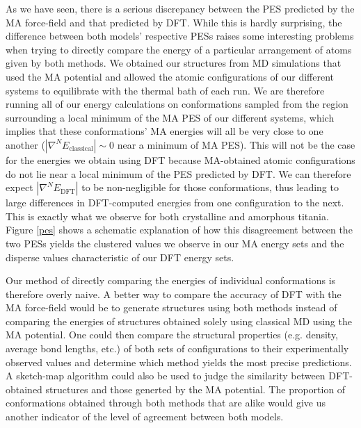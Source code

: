 \documentclass[aps,prb,twocolumn,amsmath,amssymb,superscriptaddress,longbibliography]{revtex4-1}
\newcommand\tab[1][1cm]{\hspace*{#1}} %
\begin{document}
\tab As we have seen, there is a serious discrepancy between the PES predicted by the MA force-field and that predicted by DFT.
While this is hardly surprising, the difference between both models' respective PESs raises some interesting problems when trying to directly compare the energy of a particular arrangement of atoms given by both methods. 
We obtained our structures from MD simulations that used the MA potential and allowed the atomic configurations of our different systems to equilibrate with the thermal bath of each run.
We are therefore running all of our energy calculations on conformations sampled from the region surrounding a local minimum of the MA PES of our different systems, which implies that these conformations' MA energies will all be very close to one another ($|\nabla^N E_{\text{classical}}|\sim 0$ near a minimum of MA PES).
This will not be the case for the energies we obtain using DFT because MA-obtained atomic configurations do not lie near a local minimum of the PES predicted by DFT.
We can therefore expect $|\nabla^N E_{\text{DFT}}|$ to be non-negligible for those conformations, thus leading to large differences in DFT-computed energies from one configuration to the next.
This is exactly what we observe for both crystalline and amorphous titania.
Figure \ref{pes} shows a schematic explanation of how this disagreement between the two PESs yields the clustered values we observe in our MA energy sets and the disperse values characteristic of our DFT energy sets.

\tab Our method of directly comparing the energies of individual conformations is therefore overly naive.
A better way to compare the accuracy of DFT with the MA force-field would be to generate structures using both methods instead of comparing the energies of structures obtained solely using classical MD using the MA potential.
One could then compare the structural properties (e.g. density, average bond lengths, etc.) of both sets of configurations to their experimentally observed values and determine which method yields the most precise predictions.
A sketch-map\cite{sketch-map} algorithm could also be used to judge the similarity between DFT-obtained structures and those generted by the MA potential.
The proportion of conformations obtained through both methods that are alike would give us another indicator of the level of agreement between both models. 
\end{document}
